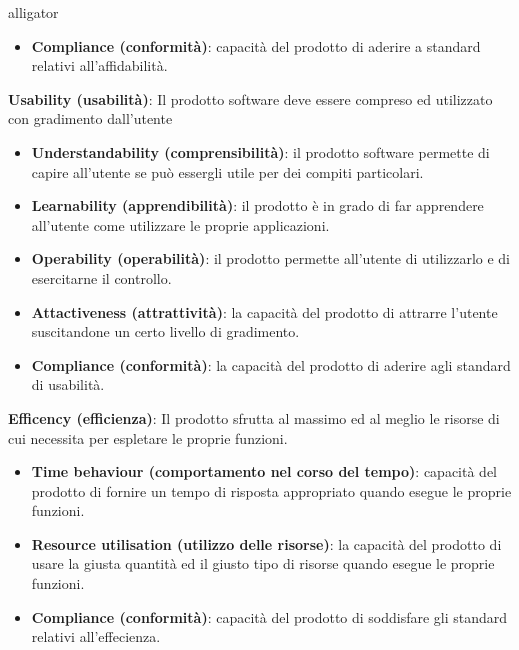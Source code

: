 \begin{labeling}{alligator}
\begin{itemize}
		\item \textbf{Compliance (conformità)}: capacità del prodotto di aderire a standard relativi all'affidabilità.
	\end{itemize}
	
	\item \textbf{Usability (usabilità)}: Il prodotto software deve essere compreso ed utilizzato con gradimento dall'utente
	\begin{itemize}
		\item \textbf{Understandability (comprensibilità)}: il prodotto software permette di capire all'utente se può essergli utile per dei compiti particolari.
		
		\item \textbf{Learnability (apprendibilità)}: il prodotto è in grado di far apprendere all'utente come utilizzare le proprie applicazioni.
		
		\item \textbf{Operability (operabilità)}: il prodotto permette all'utente di utilizzarlo e di esercitarne il controllo.
		
		\item \textbf{Attactiveness (attrattività)}: la capacità del prodotto di attrarre l'utente suscitandone un certo livello di gradimento.
		
		\item \textbf{Compliance (conformità)}: la capacità del prodotto di aderire agli standard di usabilità.
	\end{itemize}
	
	\item \textbf{Efficency (efficienza)}: Il prodotto sfrutta al massimo ed al meglio le risorse di cui necessita per espletare le proprie funzioni.
	\begin{itemize}
		\item \textbf{Time behaviour (comportamento nel corso del tempo)}: capacità del prodotto di fornire un tempo di risposta appropriato quando esegue le proprie funzioni.
		
		\item \textbf{Resource utilisation (utilizzo delle risorse)}: la capacità del prodotto di usare la giusta quantità ed il giusto tipo di risorse quando esegue le proprie funzioni.
		
		\item \textbf{Compliance (conformità)}: capacità del prodotto di soddisfare gli standard relativi all'effecienza.
		
	\end{itemize}
	

\end{labeling}
